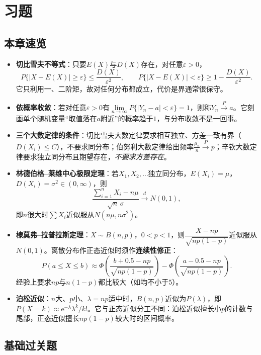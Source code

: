 \section{习题}

\subsection{本章速览}
\begin{itemize}[leftmargin=1.6em,itemsep=2pt]
    \item \textbf{切比雪夫不等式}：只要$E(X)$与$D(X)$存在，对任意$\varepsilon>0$，
    \[
    P\{|X-E(X)|\geq\varepsilon\}\leq\frac{D(X)}{\varepsilon^{2}},\qquad
    P\{|X-E(X)|<\varepsilon\}\geq1-\frac{D(X)}{\varepsilon^{2}}.
    \]
    它只利用一、二阶矩，故对任何分布都成立，代价是界通常很保守。
    \item \textbf{依概率收敛}：若对任意$\varepsilon>0$有$\lim\limits_{n\to\infty}P\{|Y_n-a|<\varepsilon\}=1$，则称$Y_n\overset{P}{\longrightarrow}a$。它刻画单个随机变量“取值落在$a$附近”的概率趋于$1$，与分布收敛不是一回事。
    \item \textbf{三个大数定律的条件}：切比雪夫大数定律要求相互独立、方差一致有界（$D(X_i)\leq C$），不要求同分布；伯努利大数定律给出频率$\frac{\mu_n}{n}\overset{P}{\longrightarrow}p$；辛钦大数定律要求独立同分布且期望存在，\emph{不要求方差存在}。
    \item \textbf{林德伯格--莱维中心极限定理}：若$X_1,X_2,\ldots$独立同分布，$E(X_i)=\mu$，$D(X_i)=\sigma^2\in(0,\infty)$，则
    \[
    \frac{\sum_{i=1}^{n}X_i-n\mu}{\sqrt{n}\,\sigma}\xrightarrow{\ d\ }N(0,1),
    \]
    即$n$很大时$\sum X_i$近似服从$N(n\mu,n\sigma^2)$。
    \item \textbf{棣莫弗--拉普拉斯定理}：$X\sim B(n,p)$，$0<p<1$，则$\dfrac{X-np}{\sqrt{np(1-p)}}$近似服从$N(0,1)$。离散分布作正态近似时须作\textbf{连续性修正}：
    \[
    P(a\leq X\leq b)\approx\Phi\!\left(\frac{b+0.5-np}{\sqrt{np(1-p)}}\right)-\Phi\!\left(\frac{a-0.5-np}{\sqrt{np(1-p)}}\right).
    \]
    经验上要求$np$与$n(1-p)$都比较大（如均不小于$5$）。
    \item \textbf{泊松近似}：$n$大、$p$小、$\lambda=np$适中时，$B(n,p)$近似为$P(\lambda)$，即$P(X=k)\approx\mathrm{e}^{-\lambda}\lambda^k/k!$。它与正态近似分工不同：泊松近似擅长小$p$的计数与尾部，正态近似擅长$np(1-p)$较大时的区间概率。
\end{itemize}

\subsection{基础过关题}

